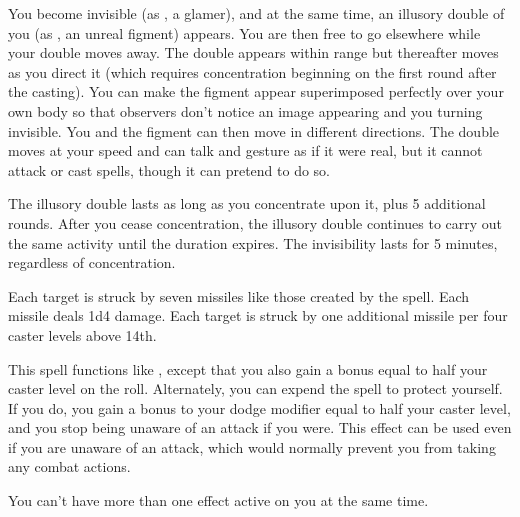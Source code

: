 \begin{spelleffect}
    You become invisible (as , a glamer), and at the same time, an illusory double of you (as , an unreal figment) appears. You are then free to go elsewhere while your double moves away. The double appears within range but thereafter moves as you direct it (which requires concentration beginning on the first round after the casting). You can make the figment appear superimposed perfectly over your own body so that observers don't notice an image appearing and you turning invisible. You and the figment can then move in different directions. The double moves at your speed and can talk and gesture as if it were real, but it cannot attack or cast spells, though it can pretend to do so.
    \par The illusory double lasts as long as you concentrate upon it, plus 5 additional rounds. After you cease concentration, the illusory double continues to carry out the same activity until the duration expires. The invisibility lasts for 5 minutes, regardless of concentration.
\end{spelleffect}

\begin{spelleffect}
    Each target is struck by seven missiles like those created by the  spell. Each missile deals 1d4 damage. Each target is struck by one additional missile per four caster levels above 14th.
\end{spelleffect}

\begin{spelleffect}
    This spell functions like , except that you also gain a bonus equal to half your caster level on the roll. Alternately, you can expend the spell to protect yourself. If you do, you gain a bonus to your dodge modifier equal to half your caster level, and you stop being unaware of an attack if you were. This effect can be used even if you are unaware of an attack, which would normally prevent you from taking any combat actions.
\end{spelleffect}
\begin{spellnotes}
    You can't have more than one  effect active on you at the same time.
\end{spellnotes}

